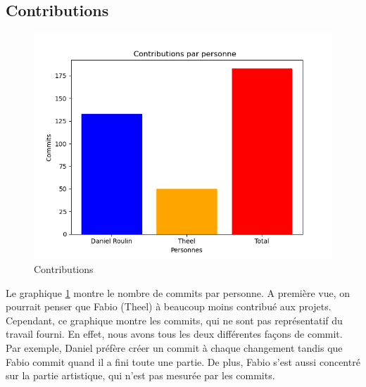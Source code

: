 \documentclass[a4paper]{article}
\begin{document}
\subsection{Contributions}
\begin{figure}[h]
    \centering
    \includegraphics[width=\textwidth]{images/stats/contributions.png}
    \caption{Contributions}
    \label{fig:contributions}
\end{figure}
Le graphique \ref{fig:contributions} montre le nombre de commits par personne. A première vue, on pourrait penser que Fabio (Theel) à beaucoup moins contribué aux projets. Cependant, ce graphique montre les commits, qui ne sont pas représentatif du travail fourni. En effet, nous avons tous les deux différentes façons de commit. Par exemple, Daniel préfère créer un commit à chaque changement tandis que Fabio commit quand il a fini toute une partie. De plus, Fabio s’est aussi concentré sur la partie artistique, qui n’est pas mesurée par les commits.

\newpage
\end{document}
